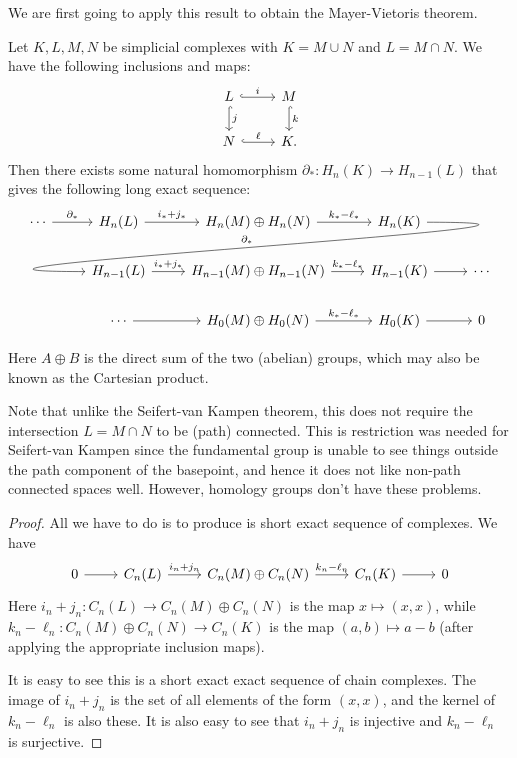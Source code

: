 \documentclass[a4paper]{article}
\begin{document}
We are first going to apply this result to obtain the Mayer-Vietoris theorem.
\begin{thm}
  Let $K, L, M, N$ be simplicial complexes with $K = M\cup N$ and $L = M\cap N$. We have the following inclusions and maps:
  \[
    \begin{tikzcd}
      L \ar[r, hook, "i"] \ar[d, hook, "j"] & M\ar[d, hook, "k"]\\
      N \ar[r, hook, "\ell"] & K.
    \end{tikzcd}
  \]
  Then there exists some natural homomorphism $\partial_*: H_n(K) \to H_{n - 1}(L)$ that gives the following long exact sequence:
  \[
    \begin{tikzcd}
      \cdots \ar[r, "\partial_*"] & H_n(L) \ar[r, "i_* + j_*"] & H_n(M) \oplus H_n(N) \ar[r, "k_* - \ell_*"] & H_n(K)\ar[out=0, in=180, looseness=2, overlay, lld, "\partial_*"']\\
      & H_{n - 1}(L) \ar[r, "i_* + j_*"] & H_{n - 1}(M) \oplus H_{n - 1}(N) \ar[r, "k_* - \ell_*"] & H_{n - 1}(K) \ar [r] & \cdots\\
      &\cdots \ar[r] & H_0(M) \oplus H_0(N) \ar[r, "k_* - \ell_*"] & H_0(K) \ar [r] & 0
    \end{tikzcd}
  \]
\end{thm}
Here $A \oplus B$ is the direct sum of the two (abelian) groups, which may also be known as the Cartesian product.

Note that unlike the Seifert-van Kampen theorem, this does not require the intersection $L = M \cap N$ to be (path) connected. This is restriction was needed for Seifert-van Kampen since the fundamental group is unable to see things outside the path component of the basepoint, and hence it does not like non-path connected spaces well. However, homology groups don't have these problems.

\begin{proof}
  All we have to do is to produce is short exact sequence of complexes. We have
  \[
    \begin{tikzcd}
      0 \ar[r] & C_n(L) \ar[r, "i_n + j_n"] & C_n(M) \oplus C_n(N) \ar[r, "k_n - \ell_n"] & C_n(K) \ar[r] & 0
    \end{tikzcd}
  \]
  Here $i_n + j_n: C_n(L) \to C_n(M) \oplus C_n(N)$ is the map $x \mapsto (x, x)$, while $k_n - \ell_n: C_n(M) \oplus C_n(N) \to C_n(K)$ is the map $(a, b) \mapsto a - b$ (after applying the appropriate inclusion maps).

  It is easy to see this is a short exact exact sequence of chain complexes. The image of $i_n + j_n$ is the set of all elements of the form $(x, x)$, and the kernel of $k_n - \ell_n$ is also these. It is also easy to see that $i_n + j_n$ is injective and $k_n - \ell_n$ is surjective.
\end{proof}
\end{document}

